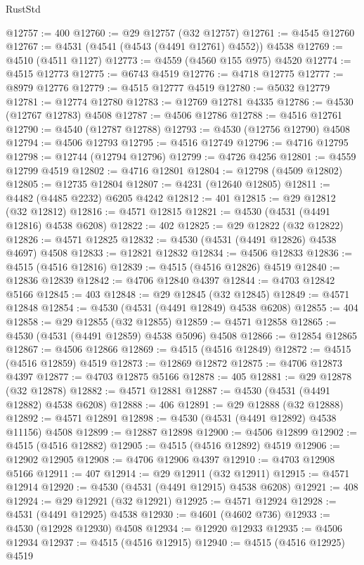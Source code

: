 \begin{lexlean}{RustStd}
\begin{coremodule}
@12757 := 400
@12760 := @29 @12757 (@32 @12757)
@12761 := @4545 @12760
@12767 := @4531 (@4541 (@4543 (@4491 @12761) @4552)) @4538
@12769 := @4510 (@4511 @1127)
@12773 := @4559 (@4560 @155 @975) @4520
@12774 := @4515 @12773
@12775 := @6743 @4519
@12776 := @4718 @12775
@12777 := @8979 @12776
@12779 := @4515 @12777 @4519
@12780 := @5032 @12779
@12781 := @12774 @12780
@12783 := @12769 @12781 @4335
@12786 := @4530 (@12767 @12783) @4508
@12787 := @4506 @12786
@12788 := @4516 @12761
@12790 := @4540 (@12787 @12788)
@12793 := @4530 (@12756 @12790) @4508
@12794 := @4506 @12793
@12795 := @4516 @12749
@12796 := @4716 @12795
@12798 := @12744 (@12794 @12796)
@12799 := @4726 @4256
@12801 := @4559 @12799 @4519
@12802 := @4716 @12801
@12804 := @12798 (@4509 @12802)
@12805 := @12735 @12804
@12807 := @4231 (@12640 @12805)
@12811 := @4482 (@4485 @2232) @6205 @4242
@12812 := 401
@12815 := @29 @12812 (@32 @12812)
@12816 := @4571 @12815
@12821 := @4530 (@4531 (@4491 @12816) @4538 @6208)
@12822 := 402
@12825 := @29 @12822 (@32 @12822)
@12826 := @4571 @12825
@12832 := @4530 (@4531 (@4491 @12826) @4538 @4697) @4508
@12833 := @12821 @12832
@12834 := @4506 @12833
@12836 := @4515 (@4516 @12816)
@12839 := @4515 (@4516 @12826) @4519
@12840 := @12836 @12839
@12842 := @4706 @12840 @4397
@12844 := @4703 @12842 @5166
@12845 := 403
@12848 := @29 @12845 (@32 @12845)
@12849 := @4571 @12848
@12854 := @4530 (@4531 (@4491 @12849) @4538 @6208)
@12855 := 404
@12858 := @29 @12855 (@32 @12855)
@12859 := @4571 @12858
@12865 := @4530 (@4531 (@4491 @12859) @4538 @5096) @4508
@12866 := @12854 @12865
@12867 := @4506 @12866
@12869 := @4515 (@4516 @12849)
@12872 := @4515 (@4516 @12859) @4519
@12873 := @12869 @12872
@12875 := @4706 @12873 @4397
@12877 := @4703 @12875 @5166
@12878 := 405
@12881 := @29 @12878 (@32 @12878)
@12882 := @4571 @12881
@12887 := @4530 (@4531 (@4491 @12882) @4538 @6208)
@12888 := 406
@12891 := @29 @12888 (@32 @12888)
@12892 := @4571 @12891
@12898 := @4530 (@4531 (@4491 @12892) @4538 @11156) @4508
@12899 := @12887 @12898
@12900 := @4506 @12899
@12902 := @4515 (@4516 @12882)
@12905 := @4515 (@4516 @12892) @4519
@12906 := @12902 @12905
@12908 := @4706 @12906 @4397
@12910 := @4703 @12908 @5166
@12911 := 407
@12914 := @29 @12911 (@32 @12911)
@12915 := @4571 @12914
@12920 := @4530 (@4531 (@4491 @12915) @4538 @6208)
@12921 := 408
@12924 := @29 @12921 (@32 @12921)
@12925 := @4571 @12924
@12928 := @4531 (@4491 @12925) @4538
@12930 := @4601 (@4602 @736)
@12933 := @4530 (@12928 @12930) @4508
@12934 := @12920 @12933
@12935 := @4506 @12934
@12937 := @4515 (@4516 @12915)
@12940 := @4515 (@4516 @12925) @4519

\end{coremodule}
\end{lexlean}
